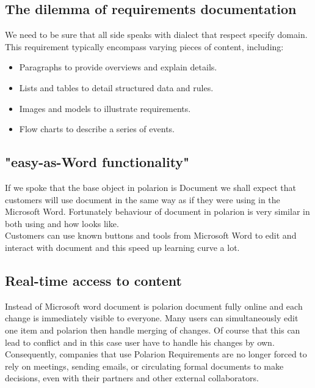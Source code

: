 \documentclass[thesis=M,english]{FITthesis}[2012/06/26]
\begin{document}
\subsection{The dilemma of requirements documentation}

We need to be sure that all side speaks with dialect that respect specify domain. This requirement typically encompass varying pieces of content, including:
\begin{itemize}[nosep]
	\item Paragraphs to provide overviews and explain details.
	\item Lists and tables to detail structured data and rules.
	\item Images and models to illustrate requirements.
	\item Flow charts to describe a series of events.
\end{itemize}

\subsection{"easy-as-Word functionality"}

If we spoke that the base object in \acrshort{polarion} is Document we shall expect that customers will use document in the same way as if they were using in the Microsoft Word. Fortunately behaviour of document in \acrshort{polarion} is very similar in both using and how looks like.\\

Customers can use known buttons and tools from Microsoft Word to edit and interact with document and this speed up learning curve a lot. 

\subsection{Real-time access to content}

Instead of Microsoft word document is \acrshort{polarion} document fully online and each change is immediately visible to everyone. Many users can simultaneously edit one item and \acrshort{polarion} then handle merging of changes. Of course that this can lead to conflict and in this case user have to handle his changes by own.\\ 

Consequently, companies that use Polarion Requirements are no longer forced to rely on meetings, sending emails, or circulating formal documents to make decisions, even with their partners and other external collaborators.
\end{document}
